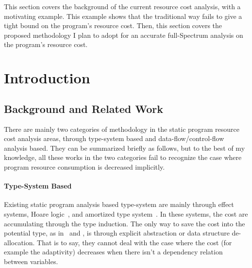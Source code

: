 This section covers the background of the current resource cost analysis,
with a 
motivating example.
This example shows that the traditional way fails to give a tight bound on the program's resource cost.
Then, this section covers the proposed methodology I plan to adopt for an accurate full-Spectrum
analysis on 
the program's resource cost.
\section{Introduction}
\label{sec:generalcost-backgroung}
\subsection{Background and Related Work}
There are mainly two categories of methodology in the static program resource cost analysis areas, 
through type-system based  and data-flow/control-flow analysis based. 
They can be summarized briefly as follows, but to the best of my knowledge,
all these works in the two categories fail to recognize the case where program resource consumption is decreased implicitly.
 \paragraph*{Type-System Based}
Existing
static program analysis based type-system are mainly through 
effect systems, 
Hoare logic~\cite{gaboardi2021graded}, and amortized type system~\cite{hoffmann_jost_2022}.
%
In these systems, the cost are accumulating through the type induction. 
The only way to save the cost into the potential
type, as in~\cite{GustafssonEL05} and \cite{hoffmann_jost_2022}, 
is through explicit abstraction or data structure de-allocation.
That is to say, they cannot deal with the case where the cost (for example the adaptivity) decreases when there isn't a dependency relation between variables.
